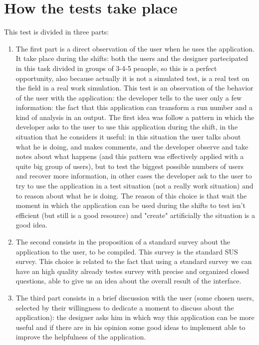 \section{How the tests take place} 


This test is divided in three parts: 
\begin{enumerate}
\item
The first part is a direct observation of the user when he uses the application. It take place during the shifts: both the users and the designer partecipated in this task divided in groups of 3-4-5 peaople, so this is a perfect opportunity, also because actually it is not a simulated test, is a real test on the field in a real work simulation. This test is an observation of the behavior of the user with the application: the developer tells to the user only a few information: the fact that this application can transform a run number and a kind of analysis in an output. 
The first idea was follow a pattern in which the developer asks to the user to use this application during the shift, in the situation that he considers it useful: in this situation the user talks about what he is doing, and makes comments, and the developer observe and take notes about what happens (and this pattern was effectively applied with a quite big group of users), but to test the biggest possible numbers of users and recover more information, in other cases the developer ask to the user to try to use the application in a test situation (not a really work situation) and to reason about what he is doing. The reason of this choice is that wait the moment in which the application can be used during the shifts to test isn't efficient (but still is a good resource) and "create" artificially the situation is a good idea.

\item
The second consists in the proposition of a standard survey about the application to the user, to be compiled. This survey is the standard SUS survey. This choice is related to the fact that using a standard survey we can have an high quality already testes survey with precise and organized closed questions, able to give us an idea about the overall result of the interface. 
\item 
The third part consists in a brief discussion with the user (some chosen users, selected by their willingness to dedicate a moment to discuss about the application): the designer asks him in which way this application can be more useful and if there are in his opinion some good ideas to implement able to improve the helpfulness of the application.

\end{enumerate} 

